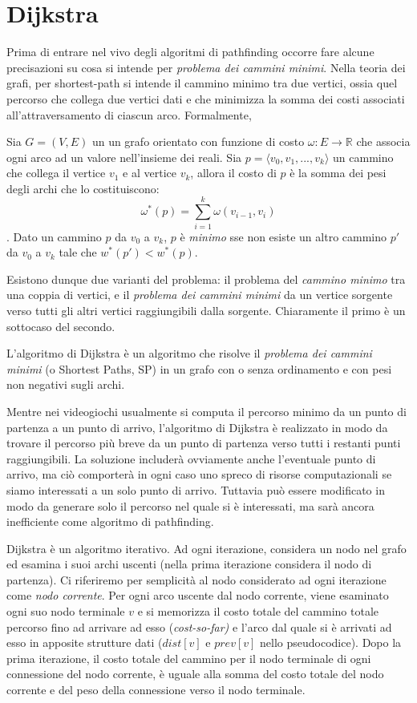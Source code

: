 \documentclass[12pt]{book}
\begin{document}
\section{Dijkstra}
\label{sec:dijkstra}
\par{Prima di entrare nel vivo degli algoritmi di pathfinding occorre fare alcune precisazioni su cosa si intende per \emph{problema dei cammini minimi}. Nella  teoria  dei  grafi, per shortest-path si intende il cammino minimo tra due vertici, ossia quel percorso che collega due vertici dati e che minimizza la somma dei costi associati all'attraversamento di ciascun arco. Formalmente, }
\par{Sia $G = (V, E)$ un un grafo orientato con funzione di costo $\omega: E \rightarrow \mathbb{R}$ che associa ogni arco ad un valore nell'insieme dei reali. Sia $p=\langle v_0, v_1, ..., v_k \rangle$ un cammino che collega il vertice $v_1$ e al vertice $v_k$, allora il costo di $p$ \`e la somma dei pesi degli archi che lo costituiscono: $$\omega^*(p) = \sum \limits_{i=1}^k \omega(v_{i-1}, v_i) $$.
Dato un cammino $p$ da $v_0$ a $v_k$, $p$ \`e \emph{minimo} sse non esiste un altro cammino $p'$ da $v_0$ a $v_k$ tale che $w^*(p') < w^*(p)$.}
\par{Esistono dunque due varianti del problema: il problema del \emph{cammino minimo} tra una coppia di vertici, e il \emph{problema dei cammini minimi} da un vertice sorgente verso tutti gli altri vertici raggiungibili dalla sorgente. Chiaramente il primo \`e un sottocaso del secondo. }
\par{
L'algoritmo di Dijkstra \`e un algoritmo che risolve il \emph{problema dei cammini minimi} (o Shortest Paths, SP) in un grafo con o senza ordinamento e con pesi non negativi sugli archi.}
\par{Mentre nei videogiochi usualmente si computa il percorso minimo da un punto di partenza a un punto di arrivo, l'algoritmo di Dijkstra \`e realizzato in modo da trovare il percorso pi\`u breve da un punto di partenza verso tutti i restanti punti raggiungibili.
La soluzione includer\`a ovviamente anche l'eventuale punto di arrivo, ma ci\`o comporter\`a in ogni caso uno spreco di risorse computazionali se siamo interessati a un solo punto di arrivo.
Tuttavia pu\`o essere modificato in modo da generare solo il percorso nel quale si \`e interessati, ma sar\`a ancora inefficiente come algoritmo di pathfinding.
}
\par{
Dijkstra \`e un algoritmo iterativo. Ad ogni iterazione, considera un nodo nel grafo ed esamina i suoi archi uscenti (nella prima iterazione considera il nodo di partenza). Ci riferiremo per semplicit\`a al nodo considerato ad ogni iterazione come \emph{nodo corrente}.
Per ogni arco uscente dal nodo corrente, viene esaminato ogni suo nodo terminale $v$ e si memorizza il costo totale del cammino totale percorso fino ad arrivare ad esso (\emph{cost-so-far)} e l'arco dal quale si \`e arrivati ad esso in apposite strutture dati ($dist[v]$ e $prev[v]$ nello pseudocodice). Dopo la prima iterazione, il costo totale del cammino per il nodo terminale di ogni connessione del nodo corrente, \`e uguale alla somma del costo totale del nodo corrente e del peso della connessione verso il nodo terminale.
}
\end{document}
